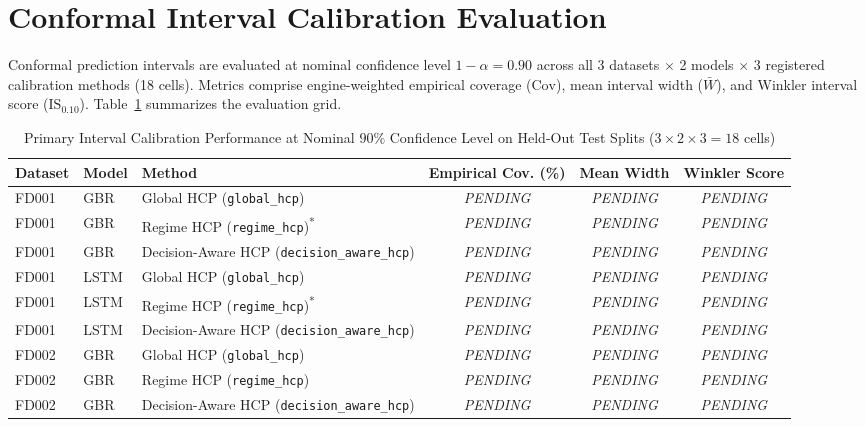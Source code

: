 \section{Conformal Interval Calibration Evaluation}
Conformal prediction intervals are evaluated at nominal confidence level $1-\alpha = 0.90$ across all 3 datasets $\times$ 2 models $\times$ 3 registered calibration methods (18 cells). Metrics comprise engine-weighted empirical coverage ($\text{Cov}$), mean interval width ($\bar{W}$), and Winkler interval score ($\text{IS}_{0.10}$). Table~\ref{tab:thesis_calibration_performance} summarizes the evaluation grid.

\begin{table}[htbp]
\centering
\small
\caption{Primary Interval Calibration Performance at Nominal $90\%$ Confidence Level on Held-Out Test Splits ($3 \times 2 \times 3 = 18$ cells)}
\label{tab:thesis_calibration_performance}
\begin{tabular}{lllccc}
\toprule
\textbf{Dataset} & \textbf{Model} & \textbf{Method} & \textbf{Empirical Cov. (\%)} & \textbf{Mean Width} & \textbf{Winkler Score} \\
\midrule
FD001 & GBR  & Global HCP (\texttt{global\_hcp})             & \textit{PENDING} & \textit{PENDING} & \textit{PENDING} \\
FD001 & GBR  & Regime HCP (\texttt{regime\_hcp})\textsuperscript{*} & \textit{PENDING} & \textit{PENDING} & \textit{PENDING} \\
FD001 & GBR  & Decision-Aware HCP (\texttt{decision\_aware\_hcp}) & \textit{PENDING} & \textit{PENDING} & \textit{PENDING} \\
\midrule
FD001 & LSTM & Global HCP (\texttt{global\_hcp})             & \textit{PENDING} & \textit{PENDING} & \textit{PENDING} \\
FD001 & LSTM & Regime HCP (\texttt{regime\_hcp})\textsuperscript{*} & \textit{PENDING} & \textit{PENDING} & \textit{PENDING} \\
FD001 & LSTM & Decision-Aware HCP (\texttt{decision\_aware\_hcp}) & \textit{PENDING} & \textit{PENDING} & \textit{PENDING} \\
\midrule
FD002 & GBR  & Global HCP (\texttt{global\_hcp})             & \textit{PENDING} & \textit{PENDING} & \textit{PENDING} \\
FD002 & GBR  & Regime HCP (\texttt{regime\_hcp})             & \textit{PENDING} & \textit{PENDING} & \textit{PENDING} \\
FD002 & GBR  & Decision-Aware HCP (\texttt{decision\_aware\_hcp}) & \textit{PENDING} & \textit{PENDING} & \textit{PENDING} \\

\end{tabular}
\end{table}
